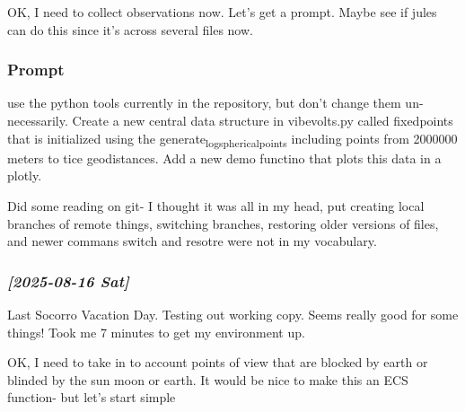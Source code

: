 \documentclass[11pt]{article}
\begin{document}
OK, I need to collect observations now.  Let's get a prompt.  Maybe see if jules
can do this since it's across several files now.

\subsubsection{Prompt}
\label{sec:orge0f1ba1}
use the python tools currently in the repository, but don't change them
un-necessarily.
Create a new central data structure in vibevolts.py
called fixedpoints that is
initialized using the generate\textsubscript{log}\textsubscript{spherical}\textsubscript{points} including
points from 2000000 meters to tice geodistances.  Add
a new demo functino that plots this data in a plotly.

Did some reading on git- I thought it was all in my head, put creating
local branches of remote things, switching branches, restoring older
versions of files, and newer commans switch and resotre were not
in my vocabulary.

\subsubsection{\textit{[2025-08-16 Sat]}}
\label{sec:org264d7d9}
Last Socorro Vacation Day. Testing out working copy. Seems really good
for some things! Took me 7 minutes to get my environment up.

OK, I need to take in to account points of view that are blocked by
earth or blinded by the sun moon or earth.  It would be nice
to make this an ECS function- but let's start simple
\end{document}
